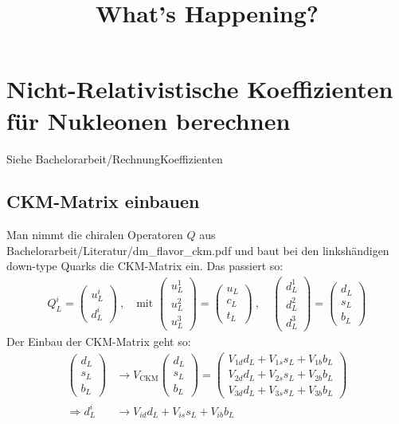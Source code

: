 \documentclass[a4,11pt]{article}
\title{What's Happening?}
\begin{document}
	\maketitle
	\section{Nicht-Relativistische Koeffizienten für Nukleonen berechnen}
Siehe Bachelorarbeit/RechnungKoeffizienten
	\subsection{CKM-Matrix einbauen}
Man nimmt die chiralen Operatoren $Q$ aus Bachelorarbeit/Literatur/dm\_flavor\_ckm.pdf und baut bei den linkshändigen down-type Quarks die CKM-Matrix ein. Das passiert so:
\begin{align*}
	Q_L^i =	\begin{pmatrix} u_L^i \\ d_L^i \end{pmatrix} \ , \quad\text{mit }
			\begin{pmatrix} u_L^1 \\ u_L^2 \\ u_L^3 \end{pmatrix}
		  = \begin{pmatrix} u_L \\ c_L \\ t_L \end{pmatrix}\ , \quad 
		    \begin{pmatrix} d_L^1 \\ d_L^2 \\ d_L^3 \end{pmatrix}
		  = \begin{pmatrix} d_L \\ s_L \\ b_L \end{pmatrix}
\end{align*}
Der Einbau der CKM-Matrix geht so:
\begin{align*}
	\begin{pmatrix} d_L \\ s_L \\ b_L \end{pmatrix}
	&\rightarrow V_\text{CKM}\begin{pmatrix} d_L \\ s_L \\ b_L \end{pmatrix}
	= \begin{pmatrix}
		V_{1d}d_L + V_{1s}s_L + V_{1b}b_L \\
		V_{2d}d_L + V_{2s}s_L + V_{2b}b_L \\
		V_{3d}d_L + V_{3s}s_L + V_{3b}b_L
	\end{pmatrix} \\
	\Rightarrow d_L^i &\rightarrow V_{id}d_L + V_{is}s_L + V_{ib}b_L
\end{align*}
\end{document}
